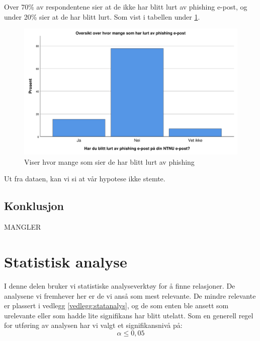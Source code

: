 Over 70\% av respondentene sier at de ikke har blitt lurt av phishing e-post, og under 20\% sier at de har blitt lurt. Som vist i tabellen under \ref{fig:lurt-av-phishing}. 
\begin{figure}[H]
    \centering
    \includegraphics[scale=0.5]{case_2/bilder/spss/lurt_phish.pdf}
    \caption[lurt-av-phishing]{Viser hvor mange som sier de har blitt lurt av phishing}
    \label{fig:lurt-av-phishing}
\end{figure}
Ut fra dataen, kan vi si at vår hypotese ikke stemte.   

\subsection{Konklusjon}
MANGLER

\section{Statistisk analyse}
I denne delen bruker vi statistiske analyseverktøy for å finne relasjoner. De analysene vi fremhever her er de vi anså som mest relevante. De mindre relevante er plassert i vedlegg \ref{vedlegg:statanalys}, og de som enten ble ansett som urelevante eller som hadde lite signifikans har blitt utelatt. Som en generell regel for utføring av analysen har vi valgt et signifikansnivå på: \[\alpha \leq 0,05\]

